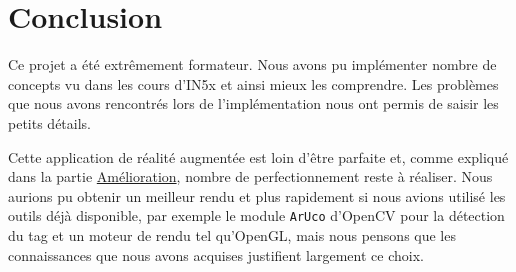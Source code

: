 \part*{Conclusion}

Ce projet a été extrêmement formateur. Nous avons pu implémenter nombre de concepts vu dans les cours d'IN5x et ainsi mieux les comprendre. Les problèmes que nous avons rencontrés lors de l'implémentation nous ont permis de saisir les petits détails.

Cette application de réalité augmentée est loin d'être parfaite et, comme expliqué dans la partie \hyperref[part:ameliorations]{Amélioration}, nombre de perfectionnement reste à réaliser. Nous aurions pu obtenir un meilleur rendu et plus rapidement si nous avions utilisé les outils déjà disponible, par exemple le module \verb|ArUco| d'OpenCV pour la détection du tag et un moteur de rendu tel qu'OpenGL, mais nous pensons que les connaissances que nous avons acquises justifient largement ce choix. 